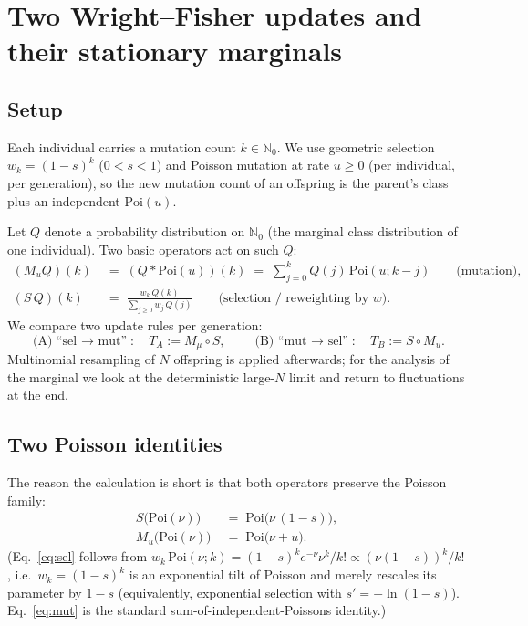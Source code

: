 \documentclass[11pt]{article}
\newcommand{\Poi}{\mathrm{Poi}}
\newcommand{\NN}{\mathbb{N}_0}
\begin{document}
\section*{Two Wright--Fisher updates and their stationary marginals}

\subsection*{Setup}
Each individual carries a mutation count $k\in\NN$. We use geometric
selection $w_k = (1-{s})^k$ ($0<{s}<1$) and Poisson mutation at rate
${u}\ge 0$ (per individual, per generation), so the new mutation count of an
offspring is the parent's class plus an independent $\Poi({u})$.

Let $Q$ denote a probability distribution on $\NN$ (the marginal class
distribution of one individual). Two basic operators act on such $Q$:
\begin{align*}
  (M_{u} Q)(k) &\;=\;(Q\ast\Poi({u}))(k)
                \;=\;\sum_{j=0}^{k} Q(j)\,\Poi({u};k-j)
                \qquad\text{(mutation)},\\
  (S\,Q)(k)     &\;=\;\frac{w_k\,Q(k)}{\sum_{j\ge 0} w_j\,Q(j)}
                \qquad\text{(selection / reweighting by $w$).}
\end{align*}
We compare two update rules per generation:
\[
  \text{(A) ``sel $\to$ mut''}:\quad T_A := M_\mu\circ S,
  \qquad
  \text{(B) ``mut $\to$ sel''}:\quad T_B := S\circ M_{u}.
\]
Multinomial resampling of $N$ offspring is applied afterwards; for the
analysis of the marginal we look at the deterministic large-$N$ limit and
return to fluctuations at the end.

\subsection*{Two Poisson identities}
The reason the calculation is short is that both operators preserve the
Poisson family:
\begin{align}
  S\bigl(\Poi(\nu)\bigr)         &\;=\;\Poi\bigl(\nu\,(1-{s})\bigr),
  \label{eq:sel}\\
  M_{u}\bigl(\Poi(\nu)\bigr)    &\;=\;\Poi\bigl(\nu+{u}\bigr).
  \label{eq:mut}
\end{align}
(Eq.~\eqref{eq:sel} follows from
$w_k\,\Poi(\nu;k)=(1-{s})^k e^{-\nu}\nu^k/k!\propto(\nu(1-{s}))^k/k!$,
i.e.~$w_k=(1-{s})^k$ is an exponential tilt of Poisson and merely rescales
its parameter by $1-{s}$ (equivalently, exponential selection with
${s}'=-\ln(1-{s})$).
Eq.~\eqref{eq:mut} is the standard sum-of-independent-Poissons identity.)
\end{document}
